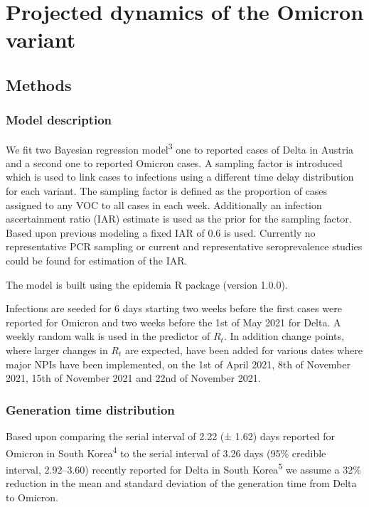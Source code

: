 \documentclass[
]{article}
\begin{document}
\hypertarget{projected-dynamics-of-the-omicron-variant}{%
\section{Projected dynamics of the Omicron variant}\label{projected-dynamics-of-the-omicron-variant}}

\hypertarget{methods}{%
\subsection{Methods}\label{methods}}

\hypertarget{model-description}{%
\subsubsection{Model description}\label{model-description}}

We fit two Bayesian regression model\textsuperscript{3} one to reported cases of Delta in Austria and a second one to reported Omicron cases. A sampling factor is introduced which is used to link cases to infections using a different time delay distribution for each variant. The sampling factor is defined as the proportion of cases assigned to any VOC to all cases in each week. Additionally an infection ascertainment ratio (IAR) estimate is used as the prior for the sampling factor. Based upon previous modeling a fixed IAR of 0.6 is used. Currently no representative PCR sampling or
current and representative seroprevalence studies could be found for estimation of the IAR.

The model is built using the epidemia R package (version 1.0.0).

Infections are seeded for 6 days starting two weeks before the first cases were reported for Omicron and two weeks before the 1st of May 2021 for Delta. A weekly random walk is used in the predictor of \(R_t\). In addition change points, where larger changes in \(R_t\) are expected, have been added for various dates where major NPIs have been implemented, on the 1st of April 2021, 8th of November 2021, 15th of November 2021 and 22nd of November 2021.

\hypertarget{generation-time-distribution}{%
\subsubsection{Generation time distribution}\label{generation-time-distribution}}

Based upon comparing the serial interval of 2.22 (± 1.62) days reported for Omicron in South Korea\textsuperscript{4}
to the serial interval of 3.26 days (95\% credible interval, 2.92--3.60) recently reported
for Delta in South Korea\textsuperscript{5} we assume a 32\% reduction
in the mean and standard deviation of the generation time from Delta to Omicron.
\end{document}
